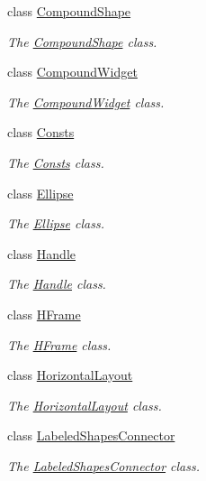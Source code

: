 \begin{DoxyCompactItemize}
class \hyperlink{classcanvascv_1_1CompoundShape}{Compound\+Shape}
\begin{DoxyCompactList}\small\item\em The \hyperlink{classcanvascv_1_1CompoundShape}{Compound\+Shape} class. \end{DoxyCompactList}\item 
class \hyperlink{classcanvascv_1_1CompoundWidget}{Compound\+Widget}
\begin{DoxyCompactList}\small\item\em The \hyperlink{classcanvascv_1_1CompoundWidget}{Compound\+Widget} class. \end{DoxyCompactList}\item 
class \hyperlink{classcanvascv_1_1Consts}{Consts}
\begin{DoxyCompactList}\small\item\em The \hyperlink{classcanvascv_1_1Consts}{Consts} class. \end{DoxyCompactList}\item 
class \hyperlink{classcanvascv_1_1Ellipse}{Ellipse}
\begin{DoxyCompactList}\small\item\em The \hyperlink{classcanvascv_1_1Ellipse}{Ellipse} class. \end{DoxyCompactList}\item 
class \hyperlink{classcanvascv_1_1Handle}{Handle}
\begin{DoxyCompactList}\small\item\em The \hyperlink{classcanvascv_1_1Handle}{Handle} class. \end{DoxyCompactList}\item 
class \hyperlink{classcanvascv_1_1HFrame}{H\+Frame}
\begin{DoxyCompactList}\small\item\em The \hyperlink{classcanvascv_1_1HFrame}{H\+Frame} class. \end{DoxyCompactList}\item 
class \hyperlink{classcanvascv_1_1HorizontalLayout}{Horizontal\+Layout}
\begin{DoxyCompactList}\small\item\em The \hyperlink{classcanvascv_1_1HorizontalLayout}{Horizontal\+Layout} class. \end{DoxyCompactList}\item 
class \hyperlink{classcanvascv_1_1LabeledShapesConnector}{Labeled\+Shapes\+Connector}
\begin{DoxyCompactList}\small\item\em The \hyperlink{classcanvascv_1_1LabeledShapesConnector}{Labeled\+Shapes\+Connector} class. \end{DoxyCompactList}\item 

\end{DoxyCompactItemize}
